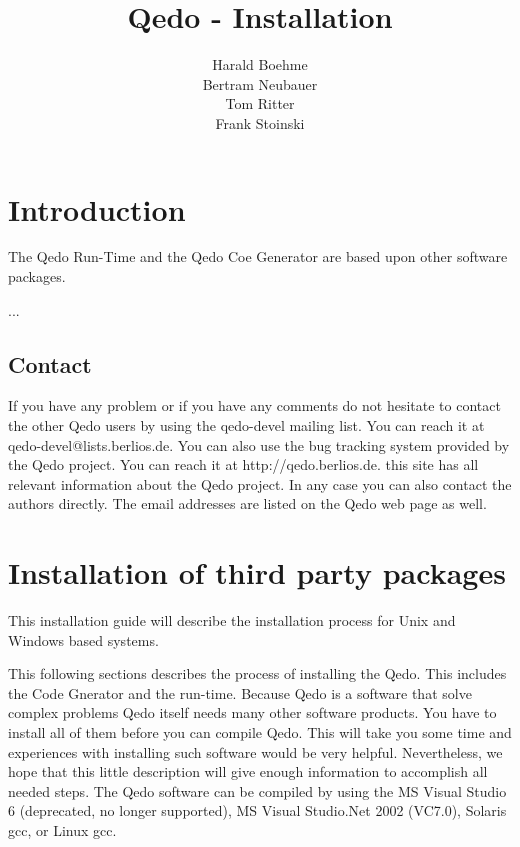 \documentclass[12pt,a4paper]{report}
\begin{document}
\title{Qedo - Installation}
\author{Harald Boehme \\ Bertram Neubauer \\ Tom Ritter \\ Frank Stoinski}

\maketitle

\setcounter{page}{1} 

\tableofcontents


\chapter{Introduction}
\label{sec:Introduction}

The Qedo Run-Time and the Qedo Coe Generator are based upon other software packages. 

...

\section{Contact}
\label{sec:Contact}

If you have any problem or if you have any comments do not hesitate to contact the other Qedo users by using the qedo-devel mailing list. You can reach it at qedo-devel@lists.berlios.de. You can also use the bug tracking system provided by the Qedo project. You can reach it at http://qedo.berlios.de. this site has all relevant information about the Qedo project. In any case you can also contact the authors directly. The email addresses are listed on the Qedo web page as well.


\chapter{Installation of third party packages}
\label{sec:Installation}

This installation guide will describe the installation process for Unix and Windows based systems.

This following sections describes the process of installing the Qedo. This includes the Code Gnerator and the run-time. Because Qedo is a software that solve complex problems Qedo itself needs many other software products. You have to install all of them before you can compile Qedo. This will take you some time and experiences with installing such software would be very helpful. Nevertheless, we hope that this little description will give enough information to accomplish all needed steps. 
The Qedo software can be compiled by using the MS Visual Studio 6 (deprecated, no longer supported), MS Visual Studio.Net 2002 (VC7.0), Solaris gcc, or Linux gcc.
\end{document}
